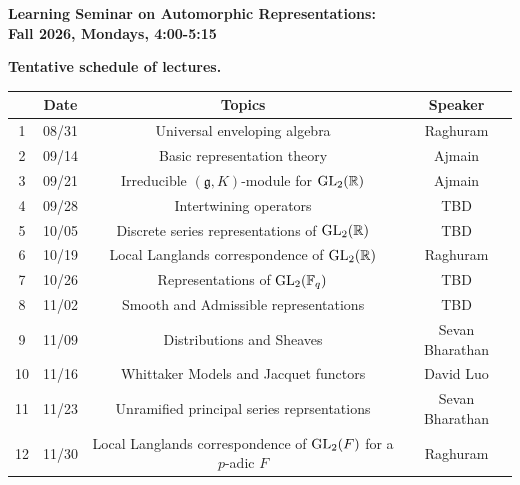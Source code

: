 \documentclass[12pt]{article}
\begin{document}
\begin{center}
 {\bf {\large Learning Seminar on Automorphic Representations: \\
 Fall 2026, Mondays, 4:00-5:15}}\\
\end{center}

\bigskip

\begin{center}
{\bf Tentative schedule of lectures.} 
\end{center}

\bigskip

{\large
\begin{center} \begin{tabular}{|c |c | c | c |}\hline
&  Date & Topics & Speaker \\\hline\hline
1 & 08/31 & Universal enveloping algebra & Raghuram \\\hline
2 & 09/14 &  Basic representation theory & Ajmain \\\hline
3 & 09/21 &  Irreducible $(\mathfrak{g},K)$-module for ${\rm GL}_2(\mathbb{R})$ & Ajmain \\\hline
4 & 09/28 &  Intertwining operators &  TBD \\\hline
5 & 10/05 &  Discrete series representations of ${\rm GL}_2(\mathbb{R})$ &  TBD \\\hline
6 & 10/19 &  Local Langlands correspondence of ${\rm GL}_2(\mathbb{R})$ & Raghuram \\\hline 
7 & 10/26 & Representations of ${\rm GL}_2(\mathbb{F}_q)$ & TBD  \\\hline
8 & 11/02 &  Smooth and Admissible representations  & TBD  \\\hline
9 & 11/09 & Distributions and Sheaves & Sevan Bharathan \\\hline
10 & 11/16 & Whittaker Models and Jacquet functors  & David Luo \\\hline
11 & 11/23 & Unramified principal series reprsentations  & Sevan Bharathan \\\hline
12 & 11/30 & Local Langlands correspondence of ${\rm GL}_2(F)$ for a $p$-adic $F$ & Raghuram \\\hline
\end{tabular}
\end{center}}
\end{document}
